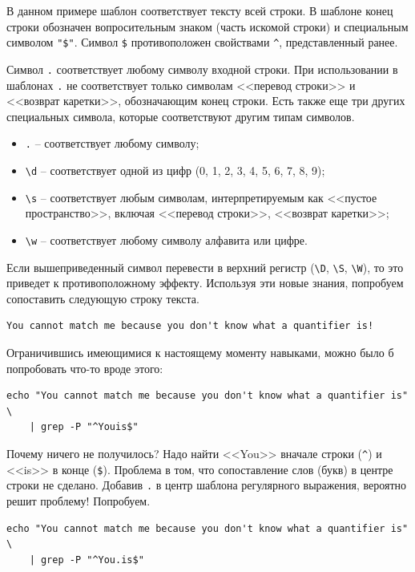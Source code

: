 \documentclass[a4paper,12pt,final,openany]{extbook}
\providecommand{\tightlist}{%
  \setlength{\itemsep}{0pt}\setlength{\parskip}{0pt}}
\begin{document}
В данном примере шаблон соответствует тексту всей строки. В шаблоне
конец строки обозначен вопросительным знаком (часть искомой строки) и
специальным символом \texttt{"\$"}. Символ \texttt{\$} противоположен свойствами
\texttt{\^{}}, представленный ранее.

Символ \texttt{.} соответствует любому символу входной строки. При использовании в шаблонах \texttt{.} не соответствует только символам
<<перевод строки>> и <<возврат каретки>>, обозначающим конец строки. Есть
также еще три других специальных символа, которые соответствуют другим
типам символов.
\begin{itemize}
\tightlist
\item
  \texttt{.} -- соответствует любому символу;
\item
  \texttt{\textbackslash{}d} -- соответствует одной из цифр (0, 1, 2, 3,
  4, 5, 6, 7, 8, 9);
\item
  \texttt{\textbackslash{}s} -- соответствует любым символам,
  интерпретируемым как <<пустое пространство>>, включая <<перевод строки>>,
  <<возврат каретки>>;
\item
  \texttt{\textbackslash{}w} -- соответствует любому символу алфавита или
  цифре.
\end{itemize}

Если вышеприведенный символ перевести в верхний регистр
(\texttt{\textbackslash{}D}, \texttt{\textbackslash{}S},
\texttt{\textbackslash{}W}), то это приведет к противоположному эффекту. Используя
эти новые знания, попробуем сопоставить следующую строку текста.
\begin{verbatim}
You cannot match me because you don't know what a quantifier is!
\end{verbatim}

Ограничившись имеющимися к настоящему моменту навыками, можно было б попробовать что-то вроде
этого:
\begin{verbatim}
echo "You cannot match me because you don't know what a quantifier is" \
    | grep -P "^Youis$"
\end{verbatim}

Почему ничего не получилось? Надо найти <<You>> вначале строки
(\texttt{\^{}}) и <<is>> в конце (\texttt{\$}). Проблема в том, что
сопоставление слов (букв) в центре строки не сделано. Добавив \texttt{.}
в центр шаблона регулярного выражения, вероятно решит проблему!
Попробуем.

\begin{verbatim}
echo "You cannot match me because you don't know what a quantifier is" \
    | grep -P "^You.is$"
\end{verbatim}
\end{document}
